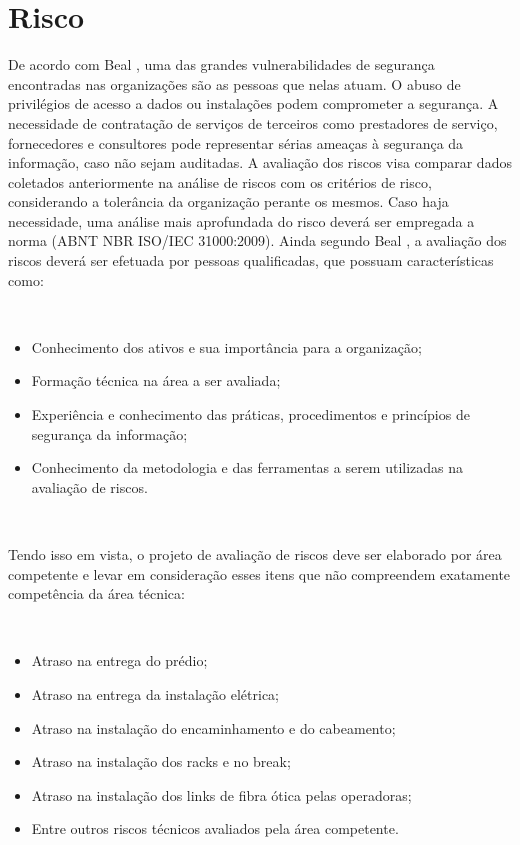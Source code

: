 \documentclass[	DIV=calc,%
							paper=a4,%
							fontsize=12pt,%
							onecolumn]{scrartcl}	 					%
\begin{document}
\section{Risco}
De acordo com Beal \cite{ID4}, uma das grandes vulnerabilidades de segurança encontradas nas organizações são as pessoas que nelas atuam. O abuso de privilégios de acesso a dados ou instalações podem comprometer a segurança. A necessidade de contratação de serviços de terceiros como prestadores de serviço, fornecedores e consultores pode representar sérias ameaças à segurança da informação, caso não sejam auditadas.
A avaliação dos riscos visa comparar dados coletados anteriormente na análise de riscos com os critérios de risco, considerando a tolerância da organização perante os mesmos. Caso haja necessidade, uma análise mais aprofundada do risco deverá ser empregada a norma (ABNT NBR ISO/IEC 31000:2009). Ainda segundo Beal \cite{ID4}, a avaliação dos riscos deverá ser efetuada por pessoas qualificadas, que possuam características como:

\

\begin{itemize}	
	\item Conhecimento dos ativos e sua importância para a organização; 
	\item Formação técnica na área a ser avaliada;
	\item Experiência e conhecimento das práticas, procedimentos e princípios de segurança da informação;
	\item Conhecimento da metodologia e das ferramentas a serem utilizadas na avaliação de riscos. 
\end{itemize}

\

Tendo isso em vista, o projeto de avaliação de riscos deve ser elaborado por área competente e levar em consideração esses itens que não compreendem exatamente competência da área técnica:

\

\begin{itemize}	
	\item Atraso na entrega do prédio; 
	\item Atraso na entrega da instalação elétrica;
	\item Atraso na instalação do encaminhamento e do cabeamento; 
	\item Atraso na instalação dos racks e no break; 
	\item Atraso na instalação dos links de fibra ótica pelas operadoras; 
	\item Entre outros riscos técnicos avaliados pela área competente. 
	
\end{itemize}
\end{document}
